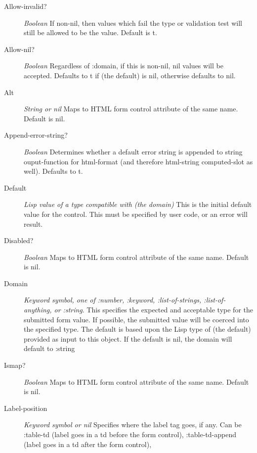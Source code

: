 \documentclass [11pt]{book}
\begin{document}
\begin{itemize}
\begin{description}
\item [Allow-invalid?]
\emph{Boolean} If non-nil, then values which fail the type or validation test will still be allowed to be the value. Default is t.


\item [Allow-nil?]
\emph{Boolean} Regardless of :domain, if this is non-nil, nil values will be accepted. Defaults to t if (the default) is nil,
otherwise defaults to nil.


\item [Alt]
\emph{String or nil} Maps to HTML form control attribute of the same name. Default is nil.


\item [Append-error-string?]
\emph{Boolean} Determines whether a default error string is appended to string ouput-function for
html-format (and therefore html-string computed-slot as well). Defaults to t.


\item [Default]
\emph{Lisp value of a type compatible with (the domain)} This is the initial default value for the control.
This must be specified by user code, or an error will result.


\item [Disabled?]
\emph{Boolean} Maps to HTML form control attribute of the same name. Default is nil.


\item [Domain]
\emph{Keyword symbol, one of :number, :keyword, :list-of-strings, :list-of-anything, or :string}.
This specifies the expected and acceptable type for the submitted form value. If possible, the
submitted value will be coerced into the specified type. The default is based upon
the Lisp type of (the default) provided as input to this object. If the default is nil,
the domain will default to :string


\item [Ismap?]
\emph{Boolean} Maps to HTML form control attribute of the same name. Default is nil.


\item [Label-position]
\emph{Keyword symbol or nil} Specifies where the label tag goes, if any.
Can be :table-td (label goes in a td before the form control), :table-td-append (label goes in a td after the form control),



\end{description}
\end{itemize}
\end{document}
